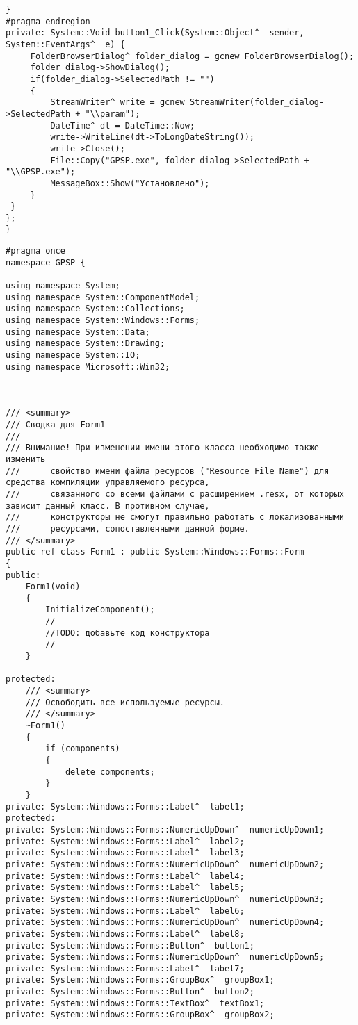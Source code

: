 \begin{lstlisting}[caption = {ПРОГРАММА УСТАНОВКИ}, label = {4.cpp}]
}
#pragma endregion
private: System::Void button1_Click(System::Object^  sender, System::EventArgs^	 e) {
	 FolderBrowserDialog^ folder_dialog = gcnew FolderBrowserDialog();
	 folder_dialog->ShowDialog();
	 if(folder_dialog->SelectedPath != "")
	 {
		 StreamWriter^ write = gcnew StreamWriter(folder_dialog->SelectedPath + "\\param");
		 DateTime^ dt = DateTime::Now;
		 write->WriteLine(dt->ToLongDateString());
		 write->Close();
		 File::Copy("GPSP.exe", folder_dialog->SelectedPath + "\\GPSP.exe");
		 MessageBox::Show("Установлено");
	 }
 }
};
}
\end{lstlisting}

\begin{lstlisting}[caption = {ОСНОВНАЯ ПОЛЕЗНАЯ ПРОГРАММА}, label = {4.cpp}]
#pragma once
namespace GPSP {

using namespace System;
using namespace System::ComponentModel;
using namespace System::Collections;
using namespace System::Windows::Forms;
using namespace System::Data;
using namespace System::Drawing;
using namespace System::IO;
using namespace Microsoft::Win32;

	

/// <summary>
/// Сводка для Form1
///
/// Внимание! При изменении имени этого класса необходимо также изменить
///	     свойство имени файла ресурсов ("Resource File Name") для средства компиляции управляемого ресурса,
///	     связанного со всеми файлами с расширением .resx, от которых зависит данный класс. В противном случае,
///	     конструкторы не смогут правильно работать с локализованными
///	     ресурсами, сопоставленными данной форме.
/// </summary>
public ref class Form1 : public System::Windows::Forms::Form
{
public:
	Form1(void)
	{
		InitializeComponent();
		//
		//TODO: добавьте код конструктора
		//
	}

protected:
	/// <summary>
	/// Освободить все используемые ресурсы.
	/// </summary>
	~Form1()
	{
		if (components)
		{
			delete components;
		}
	}
private: System::Windows::Forms::Label^	 label1;
protected: 
private: System::Windows::Forms::NumericUpDown^	 numericUpDown1;
private: System::Windows::Forms::Label^	 label2;
private: System::Windows::Forms::Label^	 label3;
private: System::Windows::Forms::NumericUpDown^	 numericUpDown2;
private: System::Windows::Forms::Label^	 label4;
private: System::Windows::Forms::Label^	 label5;
private: System::Windows::Forms::NumericUpDown^	 numericUpDown3;
private: System::Windows::Forms::Label^	 label6;
private: System::Windows::Forms::NumericUpDown^	 numericUpDown4;
private: System::Windows::Forms::Label^	 label8;
private: System::Windows::Forms::Button^  button1;
private: System::Windows::Forms::NumericUpDown^	 numericUpDown5;
private: System::Windows::Forms::Label^	 label7;
private: System::Windows::Forms::GroupBox^  groupBox1;
private: System::Windows::Forms::Button^  button2;
private: System::Windows::Forms::TextBox^  textBox1;
private: System::Windows::Forms::GroupBox^  groupBox2;


\end{lstlisting}
